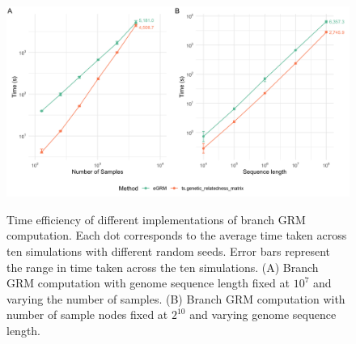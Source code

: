 \begin{figure}[h!]
    \centering
    \includegraphics[width=\textwidth]{Figures/SIFig_benchmarking_plot.png}
    \label{fig:SI_benchmarking}
    \caption{Time efficiency of different implementations of branch GRM computation.
    Each dot corresponds to the average time taken across ten simulations with different random seeds.
    Error bars represent the range in time taken across the ten simulations.
    (A) Branch GRM computation with genome sequence length fixed at $10^{7}$ and varying the number of samples.
    (B) Branch GRM computation with number of sample nodes fixed at $2^{10}$ and varying genome sequence length.}
\end{figure}
